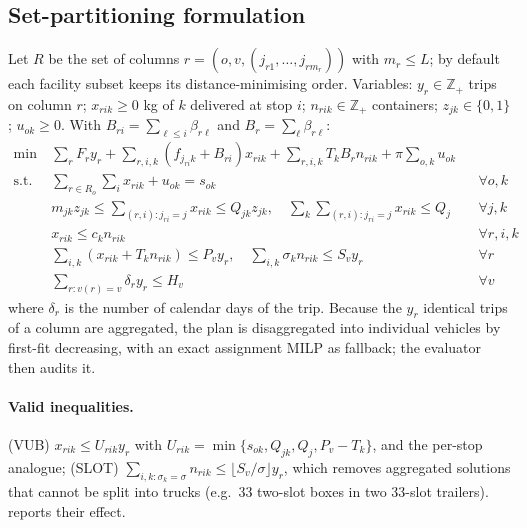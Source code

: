 \documentclass[11pt,a4paper]{article}
\newcommand{\Z}{\mathbb{Z}}
\begin{document}
\subsection{Set-partitioning formulation}
Let $R$ be the set of columns $r=(o,v,(j_{r1},\dots,j_{rm_r}))$ with $m_r\le L$; by default each facility subset keeps its distance-minimising order. Variables: $y_r\in\Z_+$ trips on column $r$; $x_{rik}\ge 0$ kg of $k$ delivered at stop $i$; $n_{rik}\in\Z_+$ containers; $z_{jk}\in\{0,1\}$; $u_{ok}\ge 0$. With $B_{ri}=\sum_{\ell\le i}\beta_{r\ell}$ and $B_r=\sum_\ell\beta_{r\ell}$:
\begin{align}
\min\ & \sum_r F_r y_r+\sum_{r,i,k}(f_{j_{ri}k}+B_{ri})x_{rik}+\sum_{r,i,k}T_kB_r n_{rik}+\pi\sum_{o,k}u_{ok} \label{eq:obj}\\
\text{s.t. } & \textstyle\sum_{r\in R_o}\sum_i x_{rik}+u_{ok}=s_{ok} && \forall o,k \label{eq:supply}\\
& m_{jk}z_{jk}\le \textstyle\sum_{(r,i):j_{ri}=j}x_{rik}\le Q_{jk}z_{jk},\quad \sum_k\sum_{(r,i):j_{ri}=j}x_{rik}\le Q_j && \forall j,k \label{eq:cap}\\
& x_{rik}\le c_k n_{rik} && \forall r,i,k \label{eq:pack}\\
& \textstyle\sum_{i,k}(x_{rik}+T_kn_{rik})\le P_v y_r,\quad \sum_{i,k}\sigma_k n_{rik}\le S_v y_r && \forall r \label{eq:payload}\\
& \textstyle\sum_{r:v(r)=v}\delta_r y_r\le H_v && \forall v \label{eq:fleet}
\end{align}
where $\delta_r$ is the number of calendar days of the trip. Because the $y_r$ identical trips of a column are aggregated, the plan is disaggregated into individual vehicles by first-fit decreasing, with an exact assignment MILP as fallback; the evaluator then audits it.

\paragraph{Valid inequalities.} (VUB) $x_{rik}\le U_{rik}y_r$ with $U_{rik}=\min\{s_{ok},Q_{jk},Q_j,P_v-T_k\}$, and the per-stop analogue; (SLOT) $\sum_{i,k:\sigma_k=\sigma}n_{rik}\le\lfloor S_v/\sigma\rfloor y_r$, which removes aggregated solutions that cannot be split into trucks (e.g.\ 33 two-slot boxes in two 33-slot trailers).  reports their effect.
\end{document}
